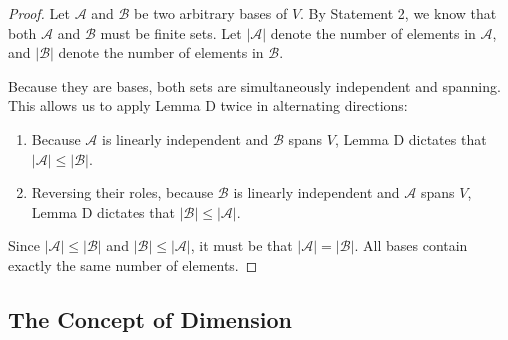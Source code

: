 \begin{proof}
Let $\mathcal{A}$ and $\mathcal{B}$ be two arbitrary bases of $V$. By Statement 2, we know that both $\mathcal{A}$ and $\mathcal{B}$ must be finite sets. Let $|\mathcal{A}|$ denote the number of elements in $\mathcal{A}$, and $|\mathcal{B}|$ denote the number of elements in $\mathcal{B}$.

Because they are bases, both sets are simultaneously independent and spanning. This allows us to apply Lemma D twice in alternating directions:

\begin{center}
\end{center}

\begin{enumerate}
    \item Because $\mathcal{A}$ is linearly independent and $\mathcal{B}$ spans $V$, Lemma D dictates that $|\mathcal{A}| \le |\mathcal{B}|$.
    \item Reversing their roles, because $\mathcal{B}$ is linearly independent and $\mathcal{A}$ spans $V$, Lemma D dictates that $|\mathcal{B}| \le |\mathcal{A}|$.
\end{enumerate}

Since $|\mathcal{A}| \le |\mathcal{B}|$ and $|\mathcal{B}| \le |\mathcal{A}|$, it must be that $|\mathcal{A}| = |\mathcal{B}|$. All bases contain exactly the same number of elements.
\end{proof}

\subsection{The Concept of Dimension}

